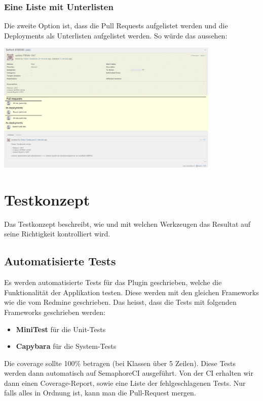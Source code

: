   \subsubsection{Eine Liste mit Unterlisten}
  Die zweite Option ist, dass die Pull Requests aufgelistet werden und die Deployments als Unterlisten aufgelistet
  werden. So würde das aussehen: \newline
  \begin{center}
    \includegraphics[width=0.8\textwidth]{images/mockup/sublists.png}
    \label{fig:mockup_sublists}
  \end{center}

\section{Testkonzept}
\label{sec:testkonzept}
Das Testkonzept beschreibt, wie und mit welchen Werkzeugen das Resultat auf seine Richtigkeit kontrolliert wird.

\subsection{Automatisierte Tests}
Es werden automatisierte Tests für das Plugin geschrieben, welche die Funktionalität der Applikation testen.
Diese werden mit den gleichen Frameworks wie die vom Redmine geschrieben. Das heisst, dass die Tests mit
folgenden Frameworks geschrieben werden:
\begin{itemize}
  \item \textbf{MiniTest} für die Unit-Tests
  \item \textbf{Capybara} für die System-Tests
\end{itemize}
Die coverage sollte 100\% betragen (bei Klassen über 5 Zeilen). Diese Tests werden dann automatisch auf 
SemaphoreCI ausgeführt. Von der CI erhalten wir dann einen Coverage-Report, sowie eine Liste der
fehlgeschlagenen Tests. Nur falls alles in Ordnung ist, kann man die Pull-Request mergen.

